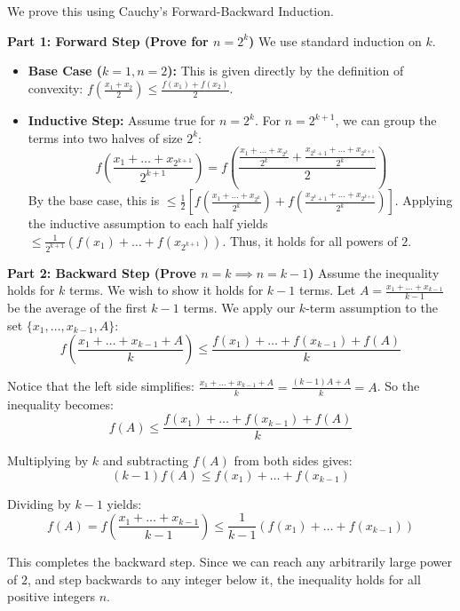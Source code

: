 \begin{solution}
We prove this using Cauchy's Forward-Backward Induction.

\textbf{Part 1: Forward Step (Prove for $n = 2^k$)}
We use standard induction on $k$.

\begin{itemize}[leftmargin=*]
    \item \textbf{Base Case ($k=1, n=2$):} This is given directly by the definition of convexity: $f\left(\frac{x_1+x_2}{2}\right) \leqslant \frac{f(x_1)+f(x_2)}{2}$.
    \item \textbf{Inductive Step:} Assume true for $n=2^k$. For $n=2^{k+1}$, we can group the terms into two halves of size $2^k$:
    \[
    f\left(\frac{x_1 + \dots + x_{2^{k+1}}}{2^{k+1}}\right) = f\left(\frac{\frac{x_1 + \dots + x_{2^k}}{2^k} + \frac{x_{2^k+1} + \dots + x_{2^{k+1}}}{2^k}}{2}\right)
    \]
    By the base case, this is $\leqslant \frac{1}{2}\left[ f\left(\frac{x_1 + \dots + x_{2^k}}{2^k}\right) + f\left(\frac{x_{2^k+1} + \dots + x_{2^{k+1}}}{2^k}\right) \right]$.
    Applying the inductive assumption to each half yields $\leqslant \frac{1}{2^{k+1}}(f(x_1) + \dots + f(x_{2^{k+1}}))$. Thus, it holds for all powers of $2$.
\end{itemize}

\textbf{Part 2: Backward Step (Prove $n=k \implies n=k-1$)}
Assume the inequality holds for $k$ terms. We wish to show it holds for $k-1$ terms.
Let $A = \frac{x_1 + \dots + x_{k-1}}{k-1}$ be the average of the first $k-1$ terms. We apply our $k$-term assumption to the set $\{x_1, \dots, x_{k-1}, A\}$:
\[
f\left(\frac{x_1 + \dots + x_{k-1} + A}{k}\right) \leqslant \frac{f(x_1) + \dots + f(x_{k-1}) + f(A)}{k}
\]

Notice that the left side simplifies: $\frac{x_1 + \dots + x_{k-1} + A}{k} = \frac{(k-1)A + A}{k} = A$.
So the inequality becomes:
\[
f(A) \leqslant \frac{f(x_1) + \dots + f(x_{k-1}) + f(A)}{k}
\]

Multiplying by $k$ and subtracting $f(A)$ from both sides gives:
\[
(k-1)f(A) \leqslant f(x_1) + \dots + f(x_{k-1})
\]

Dividing by $k-1$ yields:
\[
f(A) = f\left(\frac{x_1 + \dots + x_{k-1}}{k-1}\right) \leqslant \frac{1}{k-1}(f(x_1) + \dots + f(x_{k-1}))
\]

This completes the backward step. Since we can reach any arbitrarily large power of $2$, and step backwards to any integer below it, the inequality holds for all positive integers $n$.
\end{solution}

